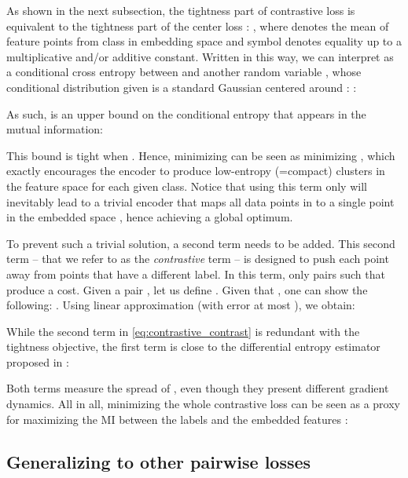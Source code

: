 \documentclass[runningheads]{llncs}
\begin{document}
As shown in the next subsection, the tightness part of contrastive loss is equivalent to the tightness part of the center loss \cite{center_loss}: , where  denotes the mean of feature points from class  in embedding space  and symbol  denotes equality up to a multiplicative and/or additive constant. Written in this way, we can interpret  as a conditional cross entropy between  and another random variable , whose conditional distribution given  is a standard Gaussian centered around : :

As such,  is an upper bound on the conditional entropy that appears in the mutual information: 

This bound is tight when . Hence, minimizing  can be seen as minimizing , which exactly encourages the encoder  to produce low-entropy (=compact) clusters in the feature space for each given class. Notice that using this term only will inevitably lead to a trivial encoder that maps all data points in  to a single point in the embedded space , hence achieving a global optimum.

To prevent such a trivial solution, a second term needs to be added. This second term -- that we refer to as the \textit{contrastive} term -- is designed to push each point away from points that have a different label. In this term, only pairs such that  produce a cost. Given a pair , let us define . Given that , one can show the following: . Using linear approximation  (with error at most ), we obtain:

While the second term in \autoref{eq:contrastive_contrast} is redundant with the tightness objective, the first term is close to the differential entropy estimator proposed in \cite{wang2011information}:

Both terms measure the spread of , even though they present different gradient dynamics.
All in all, minimizing the whole contrastive loss can be seen as a proxy for maximizing the MI between the labels  and the embedded features :


\subsection{Generalizing to other pairwise losses}
\end{document}
